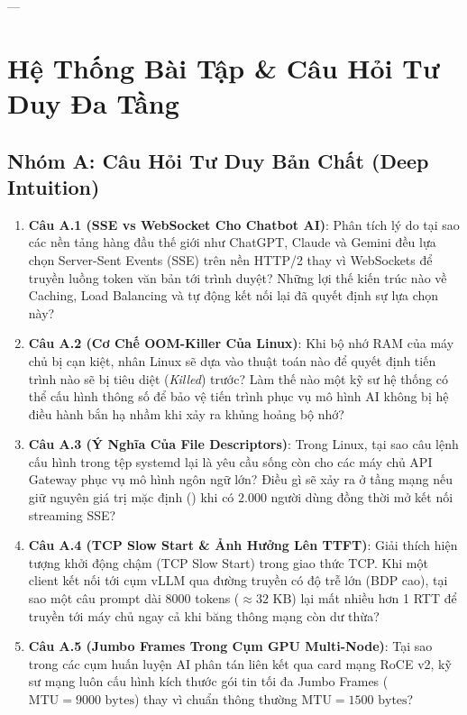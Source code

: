 ---

\section{Hệ Thống Bài Tập \& Câu Hỏi Tư Duy Đa Tầng}
\label{sec:ch03-exercises}

\subsection{Nhóm A: Câu Hỏi Tư Duy Bản Chất (Deep Intuition)}

\begin{enumerate}
  \item \textbf{Câu A.1 (SSE vs WebSocket Cho Chatbot AI)}: Phân tích lý do tại sao các nền tảng hàng đầu thế giới như ChatGPT, Claude và Gemini đều lựa chọn Server-Sent Events (SSE) trên nền HTTP/2 thay vì WebSockets để truyền luồng token văn bản tới trình duyệt? Những lợi thế kiến trúc nào về Caching, Load Balancing và tự động kết nối lại đã quyết định sự lựa chọn này?
  \item \textbf{Câu A.2 (Cơ Chế OOM-Killer Của Linux)}: Khi bộ nhớ RAM của máy chủ bị cạn kiệt, nhân Linux sẽ dựa vào thuật toán nào để quyết định tiến trình nào sẽ bị tiêu diệt (\textit{Killed}) trước? Làm thế nào một kỹ sư hệ thống có thể cấu hình thông số  để bảo vệ tiến trình phục vụ mô hình AI không bị hệ điều hành bắn hạ nhầm khi xảy ra khủng hoảng bộ nhớ?
  \item \textbf{Câu A.3 (Ý Nghĩa Của File Descriptors)}: Trong Linux, tại sao câu lệnh cấu hình  trong tệp systemd lại là yêu cầu sống còn cho các máy chủ API Gateway phục vụ mô hình ngôn ngữ lớn? Điều gì sẽ xảy ra ở tầng mạng nếu giữ nguyên giá trị mặc định () khi có $2.000$ người dùng đồng thời mở kết nối streaming SSE?
  \item \textbf{Câu A.4 (TCP Slow Start \& Ảnh Hưởng Lên TTFT)}: Giải thích hiện tượng khởi động chậm (TCP Slow Start) trong giao thức TCP. Khi một client kết nối tới cụm vLLM qua đường truyền có độ trễ lớn (BDP cao), tại sao một câu prompt dài 8000 tokens ($\approx 32\text{ KB}$) lại mất nhiều hơn 1 RTT để truyền tới máy chủ ngay cả khi băng thông mạng còn dư thừa?
  \item \textbf{Câu A.5 (Jumbo Frames Trong Cụm GPU Multi-Node)}: Tại sao trong các cụm huấn luyện AI phân tán liên kết qua card mạng RoCE v2, kỹ sư mạng luôn cấu hình kích thước gói tin tối đa Jumbo Frames ($\text{MTU} = 9000\text{ bytes}$) thay vì chuẩn thông thường $\text{MTU} = 1500\text{ bytes}$?

\end{enumerate}
